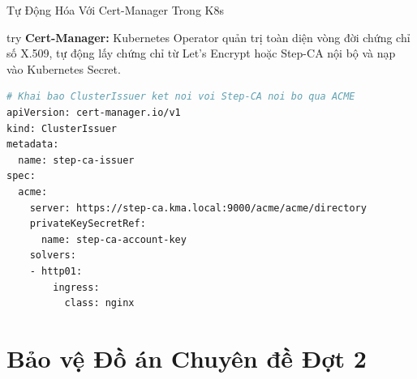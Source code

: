 \begin{frame}[fragile]{Tự Động Hóa Với Cert-Manager Trong K8s}
  \begin{beyond}{try}
    \textbf{Cert-Manager:} Kubernetes Operator quản trị toàn diện vòng đời chứng chỉ số X.509, tự động lấy chứng chỉ từ Let's Encrypt hoặc Step-CA nội bộ và nạp vào Kubernetes Secret.
  \end{beyond}

  \begin{lstlisting}[language=bash]
# Khai bao ClusterIssuer ket noi voi Step-CA noi bo qua ACME
apiVersion: cert-manager.io/v1
kind: ClusterIssuer
metadata:
  name: step-ca-issuer
spec:
  acme:
    server: https://step-ca.kma.local:9000/acme/acme/directory
    privateKeySecretRef:
      name: step-ca-account-key
    solvers:
    - http01:
        ingress:
          class: nginx
  \end{lstlisting}
\end{frame}

\section{Bảo vệ Đồ án Chuyên đề Đợt 2}

